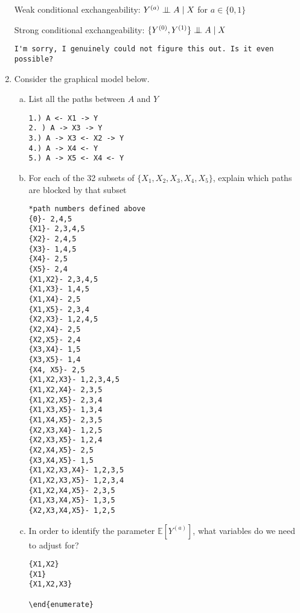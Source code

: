 \documentclass[10pt]{article}
\newcommand{\E}{\mathbb{E}}
\newcommand{\independent}{\perp\mkern-9.5mu\perp}
\begin{document}
\begin{enumerate}
Weak conditional exchangeability: $Y^{(a)}\independent A\mid X$ for $a\in\{0,1\}$

Strong conditional exchangeability: $\{Y^{(0)},Y^{(1)}\}\independent A\mid X$

\begin{verbatim}
I'm sorry, I genuinely could not figure this out. Is it even possible?
\end{verbatim}



\item Consider the graphical model below.
\begin{enumerate}[(a)]
\item List all the paths between $A$ and $Y$

\begin{verbatim}
1.) A <- X1 -> Y
2. ) A -> X3 -> Y
3.) A -> X3 <- X2 -> Y
4.) A -> X4 <- Y
5.) A -> X5 <- X4 <- Y
\end{verbatim}

\item For each of the 32 subsets of $\{X_1,X_2,X_3,X_4,X_5\}$, explain which paths are blocked by that subset

\begin{verbatim}
*path numbers defined above
{0}- 2,4,5
{X1}- 2,3,4,5
{X2}- 2,4,5
{X3}- 1,4,5
{X4}- 2,5
{X5}- 2,4
{X1,X2}- 2,3,4,5
{X1,X3}- 1,4,5
{X1,X4}- 2,5
{X1,X5}- 2,3,4
{X2,X3}- 1,2,4,5
{X2,X4}- 2,5
{X2,X5}- 2,4
{X3,X4}- 1,5
{X3,X5}- 1,4
{X4, X5}- 2,5
{X1,X2,X3}- 1,2,3,4,5
{X1,X2,X4}- 2,3,5
{X1,X2,X5}- 2,3,4
{X1,X3,X5}- 1,3,4
{X1,X4,X5}- 2,3,5
{X2,X3,X4}- 1,2,5
{X2,X3,X5}- 1,2,4
{X2,X4,X5}- 2,5
{X3,X4,X5}- 1,5
{X1,X2,X3,X4}- 1,2,3,5
{X1,X2,X3,X5}- 1,2,3,4
{X1,X2,X4,X5}- 2,3,5
{X1,X3,X4,X5}- 1,3,5
{X2,X3,X4,X5}- 1,2,5
\end{verbatim}


\item In order to identify the parameter $\E[Y^{(a)}]$, what variables do we need to adjust for?
\begin{verbatim}
{X1,X2}
{X1}
{X1,X2,X3}

\end{enumerate}


\end{verbatim}
\end{enumerate}
\end{enumerate}
\end{document}

